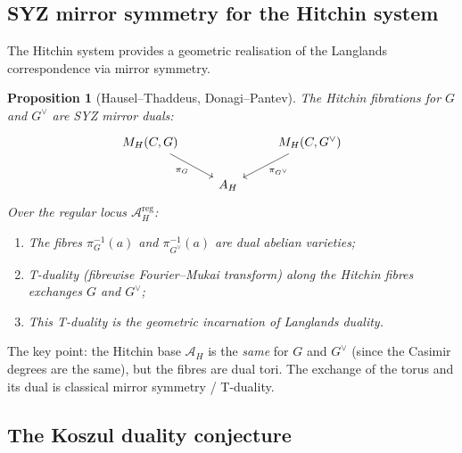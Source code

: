 \documentclass[11pt]{article}
\newtheorem{proposition}[theorem]{Proposition}
\theoremstyle{definition}
\theoremstyle{remark}
\newcommand{\cA}{\mathcal{A}}
\newcommand{\cM}{\mathcal{M}}
\begin{document}
\subsection{SYZ mirror symmetry for the Hitchin system}
\label{sec:syz}

The Hitchin system provides a geometric realisation of the Langlands correspondence via mirror symmetry.

\begin{proposition}[Hausel--Thaddeus, Donagi--Pantev]
\label{prop:syz-hitchin}
The Hitchin fibrations for $G$ and $G^\vee$ are \emph{SYZ mirror duals}:
\[
 \begin{tikzcd}
 \cM_H(C, G) \arrow[dr, "\pi_G"'] & & \cM_H(C, G^\vee) \arrow[dl, "\pi_{G^\vee}"] \\
 & \cA_H &
 \end{tikzcd}
\]
Over the regular locus $\cA_H^{\mathrm{reg}}$:
\begin{enumerate}[label=(\roman*)]
 \item The fibres $\pi_G^{-1}(a)$ and $\pi_{G^\vee}^{-1}(a)$ are dual abelian varieties;
 \item T-duality (fibrewise Fourier--Mukai transform) along the Hitchin fibres exchanges $G$ and $G^\vee$;
 \item This T-duality is the geometric incarnation of Langlands duality.
\end{enumerate}
\end{proposition}

The key point: the Hitchin base $\cA_H$ is the \emph{same} for $G$ and $G^\vee$ (since the Casimir degrees are the same), but the fibres are dual tori. The exchange of the torus and its dual is classical mirror symmetry / T-duality.

\subsection{The Koszul duality conjecture}
\end{document}
